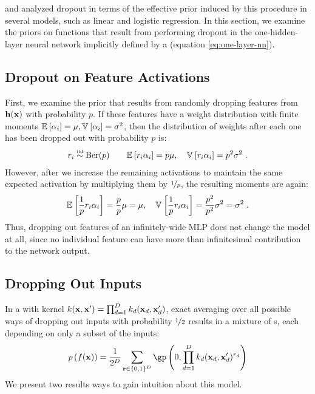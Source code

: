 \citet{baldi2013understanding} and \citet{wang2013fast} analyzed dropout in terms of the effective prior induced by this procedure in several models, such as linear and logistic regression.
In this section, we examine the priors on functions that result from performing dropout in the one-hidden-layer neural network implicitly defined by a \gp{} (equation \eqref{eq:one-layer-nn}).



\subsection{Dropout on Feature Activations}

First, we examine the prior that results from randomly dropping features from ${\bf{h}}({\bf{x}})$ with probability $p$.
If these features have a weight distribution with finite moments
$\mathbb{E}_{} \left[ { \alpha_i} \right] = \mu, \mathbb{V}_{} \left[ {\alpha_i} \right] = \sigma^2$,
then the distribution of weights after each one has been dropped out with probability $p$ is:
\begin{align}
r_i \overset{\mbox{\tiny iid}}{\sim} \textnormal{Ber}(p)
\qquad
\mathbb{E}_{} \left[ { r_i \alpha_i} \right] = p\mu, \quad \mathbb{V}_{} \left[ {r_i \alpha_i} \right] = p^2 \sigma^2 \;.
\end{align}
However, after we increase the remaining activations to maintain the same expected activation by multiplying them by $\nicefrac{1}{p}$, the resulting moments are again:
\begin{align}
\mathbb{E}_{} \left[ { \frac{1}{p} r_i \alpha_i } \right] = \frac{p}{p}\mu = \mu, \quad \mathbb{V}_{} \left[ { \frac{1}{p} r_i \alpha_i} \right] = \frac{p^2}{p^2} \sigma^2 = \sigma^2 \;.
\end{align}
Thus, dropping out features of an infinitely-wide MLP does not change the model at all, since no individual feature can have more than infinitesimal contribution to the network output.



\subsection{Dropping Out Inputs}

In a \gp{} with kernel ${k({\bf{x}}, {\bf{x}}') = \prod_{d=1}^D k_d({\bf{x}}_d, {\bf{x}}_d')}$, exact averaging over all possible ways of dropping out inputs with probability $\nicefrac{1}{2}$ results in a mixture of \gp{}s, each depending on only a subset of the inputs:
\begin{align}
p \left( f(\vx) \right)= \frac{1}{2^D} \sum_{\vr \in \{0,1\}^D}  \textnormal{\gp} \left(0, \prod_{d=1}^D k_d(\vx_d, \vx_d')^{r_d} \right)
\label{eq:dropout-mixture}
\end{align}
We present two results ways to gain intuition about this model.

